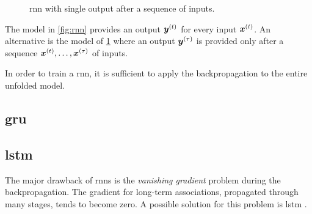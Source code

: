 \begin{figure}
  \centering
  \caption{\ac{rnn} with single output after a sequence of inputs.}
  \label{fig:rnnSO}
\end{figure}
The model in \cref{fig:rnn} provides an output $\bm{y}^{(t)}$ for every
input $\bm{x}^{(t)}$. An alternative is the model of
\cref{fig:rnnSO} where an output $\bm{y}^{(\tau)}$ is provided only
after a sequence $\bm{x}^{(t)},\dots,\bm{x}^{(\tau)}$ of inputs.

In order to train a \ac{rnn}, it is sufficient to apply the
backpropagation to the entire unfolded model.

\subsection{\acf{gru}}

\subsection{\acf{lstm}}
The major drawback of \acp{rnn} is the \emph{vanishing
  gradient} problem during the backpropagation. The gradient
for long-term associations, propagated through many stages, tends to
become zero. A possible solution for this problem is \ac{lstm} \cite{hochreiter_1997_lstm}.

